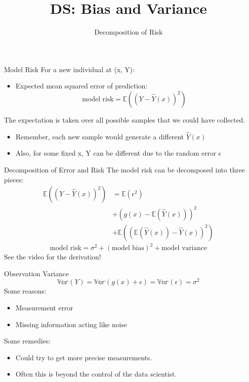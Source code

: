 \documentclass[aspectratio=169]{../latex_main/tntbeamer}  %
\title[Introduction]{DS: Bias and Variance}
\subtitle{Decomposition of Risk}
\begin{document}
	
	\maketitle
	\begin{frame}{Model Risk}
	    For a new individual at (x, Y):
	    \begin{itemize}
	        \item Expected mean squared error of prediction:
	        \begin{equation*}
	            \text{model risk} = \mathbb{E}((Y-\hat{Y}(x))^2)
	        \end{equation*}
	    \end{itemize}
	    The expectation is taken over all possible samples that we could have collected.
	    \begin{itemize}
	        \item Remember, each new sample would generate a different $\hat{Y}(x)$
	        \item Also, for some fixed x, Y can be different due to the random error $\epsilon$
	    \end{itemize}
	\end{frame}
	
	
	\begin{frame}[c]{Decomposition of Error and Risk}
	    The model risk can be decomposed into three pieces:
	    \begin{align*}
	        \mathbb{E}((Y-\hat{Y}(x))^2) &= \mathbb{E}(\epsilon^2)\\
	        &+ (g(x) - \mathbb{E}(\hat{Y}(x)))^2\\
	        &+ \mathbb{E}((\mathbb{E}(\hat{Y}(x))-\hat{Y}(x))^2)
	    \end{align*}
	    \begin{equation*}
	        \text{model risk} = \sigma^2 + (\text{model bias})^2 + \text{model variance}
	    \end{equation*}
	    See the video for the derivation!
	\end{frame}
	
	
	\begin{frame}[c]{Observation Variance}
	    \begin{equation*}
	        \mathbb{Var}(Y) = \mathbb{Var}(g(x) + \epsilon) = \mathbb{Var}(\epsilon) = \sigma^2
	    \end{equation*}
	    Some reasons:
	    \begin{itemize}
	        \item Measurement error
	        \item Missing information acting like noise
	    \end{itemize}
	    \bigskip
	    Some remedies:
	    \begin{itemize}
	        \item Could try to get more precise measurements.
	        \item Often this is beyond the control of the data scientist.
	    \end{itemize}
	\end{frame}
	
\end{document}
